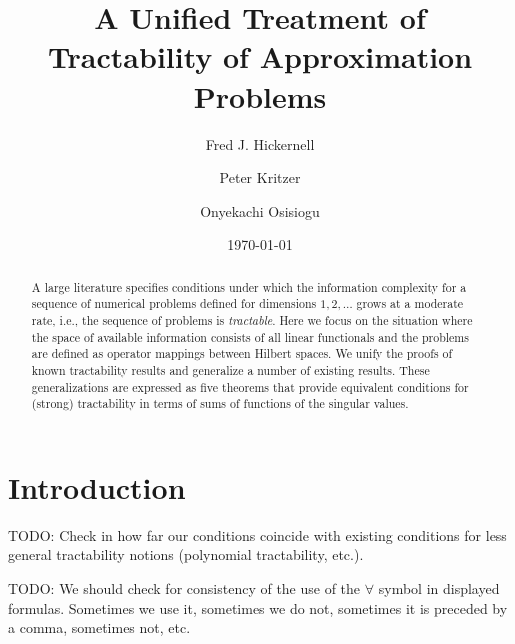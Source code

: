 \documentclass[sort&compress]{elsarticle}
\newcommand{\fred}[1]{\begingroup\color{blue}#1\endgroup}
\begin{document}
\title{\fred{A Unified Treatment of Tractability of Approximation Problems}}

\author[1]{Fred J. Hickernell}
\author[2]{Peter Kritzer}
\author[1]{Onyekachi Osisiogu}
\date{\today}


\begin{abstract}
    A large literature specifies conditions under which the information complexity for a sequence of numerical problems defined for dimensions $1, 2, \ldots$ grows at a moderate rate, i.e., the sequence of problems is \emph{tractable}.  Here we focus on the situation where the space of available information consists of all linear functionals and the problems are defined as operator mappings between Hilbert spaces.  We unify the proofs of known tractability results and generalize a number of existing results.  These generalizations are expressed as five theorems that provide equivalent conditions for (strong) tractability in terms of sums of functions of the singular values.  
\end{abstract}

\maketitle




\section{Introduction}



\medskip

TODO: Check in how far our conditions coincide with existing conditions for less general tractability notions (polynomial tractability, etc.).

\medskip

TODO: We should check for consistency of the use of the $\forall$ symbol in displayed formulas. Sometimes we use it, sometimes we do not, sometimes it is preceded by a comma, sometimes not, etc. 
\end{document}
